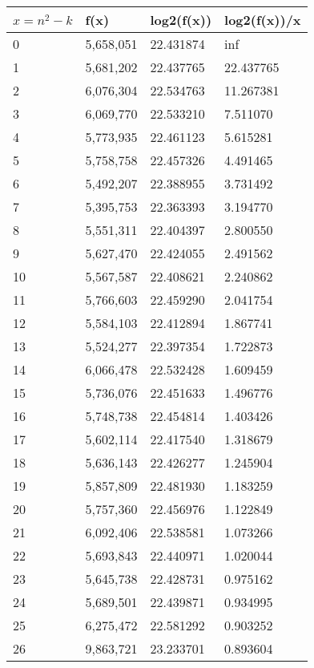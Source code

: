 \begin{table}[H]
\parbox{0.3\textwidth}{
  \begin{tabular}{| l | l | l | l |}
    \hline
    $x=n^2-k$ & f(x) & log2(f(x)) & log2(f(x))/x 	\\ \hline
    0	&5,658,051	&22.431874	&inf \\ \hline
    1	&5,681,202	&22.437765	&22.437765 \\ \hline
    2	&6,076,304	&22.534763	&11.267381 \\ \hline
    3	&6,069,770	&22.533210	&7.511070 \\ \hline
    4	&5,773,935	&22.461123	&5.615281 \\ \hline
    5	&5,758,758	&22.457326	&4.491465 \\ \hline
    6	&5,492,207	&22.388955	&3.731492 \\ \hline
    7	&5,395,753	&22.363393	&3.194770 \\ \hline
    8	&5,551,311	&22.404397	&2.800550 \\ \hline
    9	&5,627,470	&22.424055	&2.491562 \\ \hline
    10	&5,567,587	&22.408621	&2.240862 \\ \hline
    11	&5,766,603	&22.459290	&2.041754 \\ \hline
    12	&5,584,103	&22.412894	&1.867741 \\ \hline
    13	&5,524,277	&22.397354	&1.722873 \\ \hline
    14	&6,066,478	&22.532428	&1.609459 \\ \hline
    15	&5,736,076	&22.451633	&1.496776 \\ \hline
    16	&5,748,738	&22.454814	&1.403426 \\ \hline
    17	&5,602,114	&22.417540	&1.318679 \\ \hline
    18	&5,636,143	&22.426277	&1.245904 \\ \hline
    19	&5,857,809	&22.481930	&1.183259 \\ \hline
    20	&5,757,360	&22.456976	&1.122849 \\ \hline
    21	&6,092,406	&22.538581	&1.073266 \\ \hline
    22	&5,693,843	&22.440971	&1.020044 \\ \hline
    23	&5,645,738	&22.428731	&0.975162 \\ \hline
    24	&5,689,501	&22.439871	&0.934995 \\ \hline
    25	&6,275,472	&22.581292	&0.903252 \\ \hline
    26	&9,863,721	&23.233701	&0.893604 \\ \hline

\end{tabular}}
\end{table}
